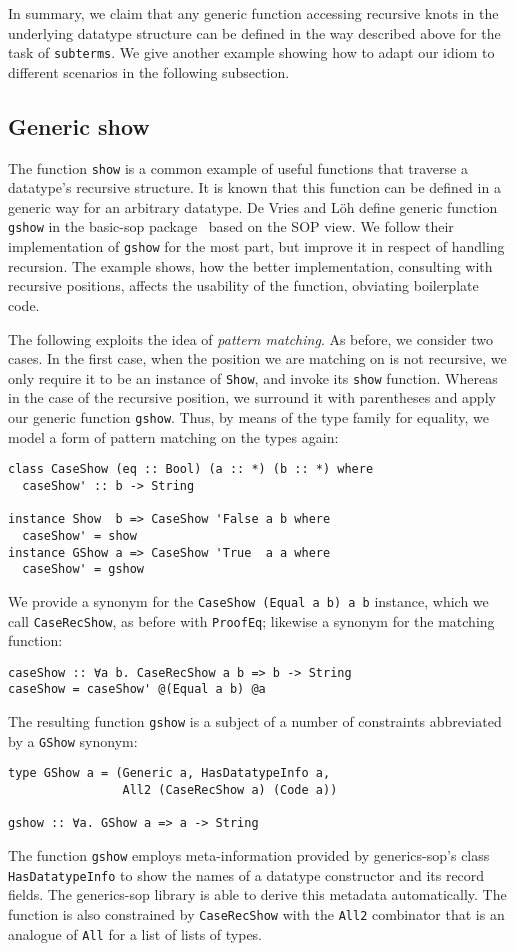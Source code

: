 \documentclass[runningheads]{llncs}
\newcommand{\K}[1]{\lstinline[style=fancy]{#1}}
\begin{document}
In summary, we claim that any generic function accessing recursive knots in the underlying datatype structure can be defined in the way described above for the task of \K{subterms}. We give another example showing how to adapt our idiom to different scenarios in the following subsection.

\subsection{Generic show}
\label{subsec:gshow}

The function \K{show} is a common example of useful functions that traverse a datatype's recursive structure. It is known that this function can be defined in a generic way for an arbitrary datatype. De Vries and L\"{o}h define generic function \K{gshow} in the \textsf{basic-sop} package~\cite{basic-sop} based on the SOP view. We follow their implementation of \K{gshow} for the most part, but improve it in respect of handling recursion. The example shows, how the better implementation, consulting with recursive positions, affects the usability of the function, obviating boilerplate code.

The following exploits the idea of \emph{pattern matching}. As before, we consider two cases. In the first case, when the position we are matching on is not recursive, we only require it to be an  instance of \K{Show}, and invoke its \K{show} function. Whereas in the case of the recursive position, we surround it with parentheses and apply our generic function \K{gshow}. Thus, by means of the type family for equality, we model a form of pattern matching on the types again:
\begin{lstlisting}[style=fancy]
class CaseShow (eq :: Bool) (a :: *) (b :: *) where
  caseShow' :: b -> String

instance Show  b => CaseShow 'False a b where
  caseShow' = show
instance GShow a => CaseShow 'True  a a where
  caseShow' = gshow
\end{lstlisting}
We provide a synonym for the \K{CaseShow (Equal a b) a b} instance, which we call \K{CaseRecShow}, as before with \K{ProofEq}; likewise a synonym for the matching function:
\begin{lstlisting}[style=fancy]
caseShow :: ∀a b. CaseRecShow a b => b -> String
caseShow = caseShow' @(Equal a b) @a
\end{lstlisting}

The resulting function \K{gshow} is a subject of a number of constraints abbreviated by a \K{GShow} synonym:
\begin{lstlisting}[style=fancy]
type GShow a = (Generic a, HasDatatypeInfo a,
                All2 (CaseRecShow a) (Code a))

gshow :: ∀a. GShow a => a -> String
\end{lstlisting}
The function \K{gshow} employs meta-information provided by \textsf{generics-sop}'s class \K{HasDatatypeInfo} to show the names of a datatype constructor and its record fields. The \textsf{generics-sop} library is able to derive this metadata automatically.
The function is also constrained by \K{CaseRecShow} with the \K{All2} combinator that is an analogue of \K{All} for a list of lists of types. 
\end{document}
